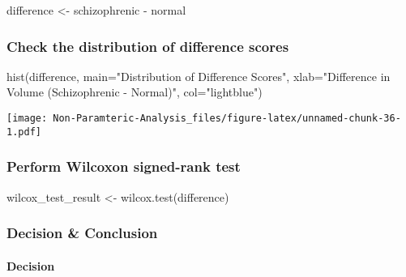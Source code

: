 \documentclass[
]{article}
\newenvironment{Shaded}{\begin{snugshade}}{\end{snugshade}}
\newcommand{\AttributeTok}[1]{\textcolor[rgb]{0.77,0.63,0.00}{#1}}
\newcommand{\FunctionTok}[1]{\textcolor[rgb]{0.00,0.00,0.00}{#1}}
\newcommand{\NormalTok}[1]{#1}
\newcommand{\OtherTok}[1]{\textcolor[rgb]{0.56,0.35,0.01}{#1}}
\newcommand{\SpecialCharTok}[1]{\textcolor[rgb]{0.00,0.00,0.00}{#1}}
\newcommand{\StringTok}[1]{\textcolor[rgb]{0.31,0.60,0.02}{#1}}
\begin{document}
\begin{Shaded}
\begin{Highlighting}[]
\NormalTok{difference }\OtherTok{\textless{}{-}}\NormalTok{ schizophrenic }\SpecialCharTok{{-}}\NormalTok{ normal}
\end{Highlighting}
\end{Shaded}

\hypertarget{check-the-distribution-of-difference-scores}{%
\subsubsection{Check the distribution of difference
scores}\label{check-the-distribution-of-difference-scores}}

\begin{Shaded}
\begin{Highlighting}[]
\FunctionTok{hist}\NormalTok{(difference, }\AttributeTok{main=}\StringTok{"Distribution of Difference Scores"}\NormalTok{, }\AttributeTok{xlab=}\StringTok{"Difference in Volume (Schizophrenic {-} Normal)"}\NormalTok{, }\AttributeTok{col=}\StringTok{"lightblue"}\NormalTok{)}
\end{Highlighting}
\end{Shaded}

\texttt{[image: Non-Paramteric-Analysis\_files/figure-latex/unnamed-chunk-36-1.pdf]}

\hypertarget{perform-wilcoxon-signed-rank-test}{%
\subsubsection{Perform Wilcoxon signed-rank
test}\label{perform-wilcoxon-signed-rank-test}}

\begin{Shaded}
\begin{Highlighting}[]
\NormalTok{wilcox\_test\_result }\OtherTok{\textless{}{-}} \FunctionTok{wilcox.test}\NormalTok{(difference)}
\end{Highlighting}
\end{Shaded}

\hypertarget{decision-conclusion-4}{%
\subsubsection{Decision \& Conclusion}\label{decision-conclusion-4}}

\hypertarget{decision}{%
\paragraph{Decision}\label{decision}}
\end{document}
